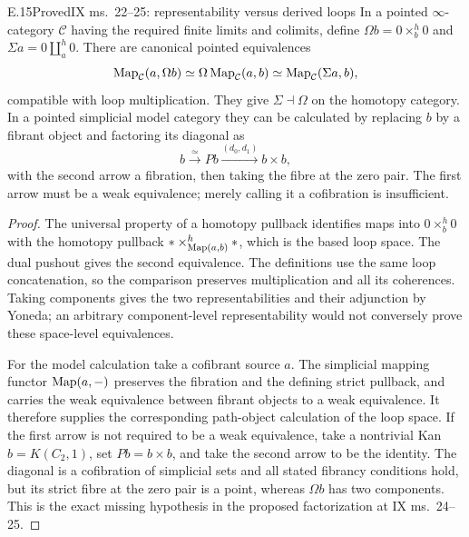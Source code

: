 \begin{claim}{E.15}{Proved}{IX ms.~22--25: representability versus derived loops}
In a pointed $\infty$-category $\mathcal C$ having the required finite limits and colimits, define $\Omega b=0\times_b^h0$ and $\Sigma a=0\amalg_a^h0$. There are canonical pointed equivalences
\[
 \operatorname{Map}_{\mathcal C}(a,\Omega b)\simeq
 \Omega\operatorname{Map}_{\mathcal C}(a,b)\simeq
 \operatorname{Map}_{\mathcal C}(\Sigma a,b),
\]
compatible with loop multiplication. They give $\Sigma\dashv\Omega$ on the homotopy category. In a pointed simplicial model category they can be calculated by replacing $b$ by a fibrant object and factoring its diagonal as
\[
 b\xrightarrow{\simeq}P b\xrightarrow{(d_0,d_1)}b\times b,
\]
with the second arrow a fibration, then taking the fibre at the zero pair. The first arrow must be a weak equivalence; merely calling it a cofibration is insufficient.
\end{claim}
\begin{proof}
The universal property of a homotopy pullback identifies maps into $0\times_b^h0$ with the homotopy pullback $*\times_{\operatorname{Map}(a,b)}^h*$, which is the based loop space. The dual pushout gives the second equivalence. The definitions use the same loop concatenation, so the comparison preserves multiplication and all its coherences. Taking components gives the two representabilities and their adjunction by Yoneda; an arbitrary component-level representability would not conversely prove these space-level equivalences.

For the model calculation take a cofibrant source $a$. The simplicial mapping functor $\operatorname{Map}(a,-)$ preserves the fibration and the defining strict pullback, and carries the weak equivalence between fibrant objects to a weak equivalence. It therefore supplies the corresponding path-object calculation of the loop space. If the first arrow is not required to be a weak equivalence, take a nontrivial Kan $b=K(C_2,1)$, set $P b=b\times b$, and take the second arrow to be the identity. The diagonal is a cofibration of simplicial sets and all stated fibrancy conditions hold, but its strict fibre at the zero pair is a point, whereas $\Omega b$ has two components. This is the exact missing hypothesis in the proposed factorization at IX ms.~24--25.
\end{proof}

